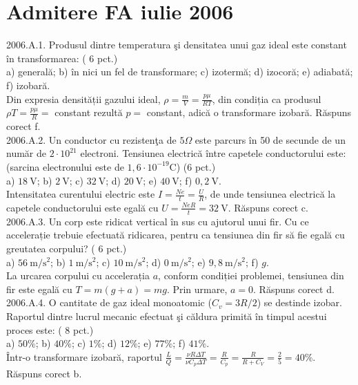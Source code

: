 \section{Admitere FA iulie 2006}

2006.A.1. Produsul dintre temperatura şi densitatea unui gaz ideal este constant în transformarea: ( 6 pct.)\\ a) generală; b) în nici un fel de transformare; c) izotermă; d) izocoră; e) adiabată; f) izobară.\\ Din expresia densității gazului ideal, $\rho=\frac{m}{V}=\frac{p \mu}{R T}$, din condiția ca produsul $\rho T=\frac{p \mu}{R}=$ constant rezultă $p=$ constant, adică o transformare izobară. Răspuns corect f.\\

2006.A.2. Un conductor cu rezistenţa de $5 \Omega$ este parcurs în 50 de secunde de un număr de $2 \cdot 10^{21}$ electroni. Tensiunea electrică între capetele conductorului este: (sarcina electronului este de $1,6 \cdot 10^{-19} \mathrm{C}$) (6 pct.)\\ a) $18 \mathrm{~V}$; b) $2 \mathrm{~V}$; c) $32 \mathrm{~V}$; d) $20 \mathrm{~V}$; e) $40 \mathrm{~V}$; f) $0,2 \mathrm{~V}$.\\ Intensitatea curentului electric este $I=\frac{N e}{t}=\frac{U}{R}$, de unde tensiunea electrică la capetele conductorului este egală cu $U=\frac{N e R}{t}=32 \mathrm{~V}$. Răspuns corect c.\\

2006.A.3. Un corp este ridicat vertical în sus cu ajutorul unui fir. Cu ce accelerație trebuie efectuată ridicarea, pentru ca tensiunea din fir să fie egală cu greutatea corpului? ( 6 pct.)\\ a) $56 \mathrm{~m} / \mathrm{s}^{2}$; b) $1 \mathrm{~m} / \mathrm{s}^{2}$; c) $10 \mathrm{~m} / \mathrm{s}^{2}$; d) $0 \mathrm{~m} / \mathrm{s}^{2}$; e) $9,8 \mathrm{~m} / \mathrm{s}^{2}$; f) $g$.\\ La urcarea corpului cu accelerația $a$, conform condiției problemei, tensiunea din fir este egală cu $T=m(g+a)=m g$. Prin urmare, $a=0$. Răspuns corect d.\\

2006.A.4. O cantitate de gaz ideal monoatomic ($C_{v}=3 R / 2$) se destinde izobar. Raportul dintre lucrul mecanic efectuat şi căldura primită în timpul acestui proces este: ( 8 pct.)\\ a) $50 \%$; b) $40 \%$; c) $1 \%$; d) $12 \%$; e) $77 \%$; f) $41 \%$.\\ Într-o transformare izobară, raportul $\frac{L}{Q}=\frac{\nu R \Delta T}{\nu C_{p} \Delta T}=\frac{R}{C_{p}}=\frac{R}{R+C_{V}}=\frac{2}{5}=40 \%$. Răspuns corect b.\\

